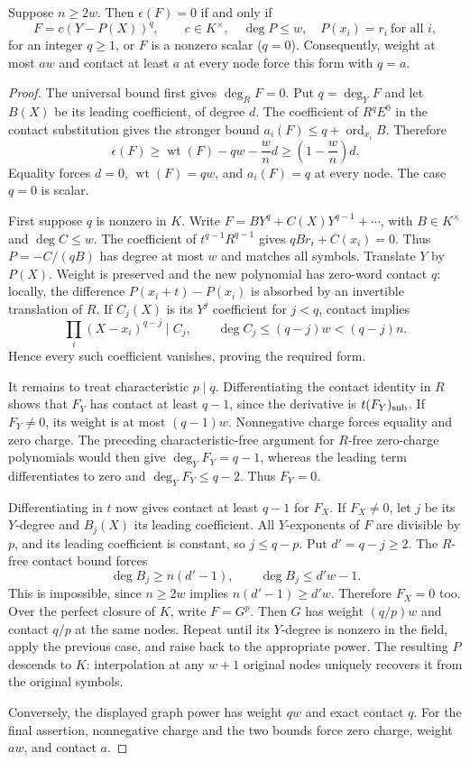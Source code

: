 \begin{theorem}
\label{cor:contact-zero-charge}
\label{thm:contact-uniform-rigidity}
Suppose $n\ge2w$. Then $\epsilon(F)=0$ if and only if
\[
 F=c(Y-P(X))^q,\qquad c\in K^\times,
 \quad\deg P\le w,\quad P(x_i)=r_i\ \text{for all }i,
\]
for an integer $q\ge1$, or $F$ is a nonzero scalar ($q=0$).
Consequently, weight at most $aw$ and contact at least $a$ at every
node force this form with $q=a$.
\end{theorem}
\begin{proof}
The universal bound first gives $\deg_R F=0$. Put $q=\deg_Y F$ and
let $B(X)$ be its leading coefficient, of degree $d$.
The coefficient of $R^qE^0$ in the contact substitution gives the
stronger bound $a_i(F)\le q+\operatorname{ord}_{x_i}B$. Therefore
\[
 \epsilon(F)\ge\operatorname{wt}(F)-qw-\frac wn d
 \ge\left(1-\frac wn\right)d.
\]
Equality forces $d=0$, $\operatorname{wt}(F)=qw$, and $a_i(F)=q$ at
every node. The case $q=0$ is scalar.

First suppose $q$ is nonzero in $K$. Write
$F=BY^q+C(X)Y^{q-1}+\cdots$, with $B\in K^\times$ and $\deg C\le w$.
The coefficient of $t^{q-1}R^{q-1}$ gives $qBr_i+C(x_i)=0$.
Thus $P=-C/(qB)$ has degree at most $w$ and matches all symbols.
Translate $Y$ by $P(X)$. Weight is preserved and the new polynomial
has zero-word contact $q$: locally, the difference
$P(x_i+t)-P(x_i)$ is absorbed by an invertible translation of $R$.
If $C_j(X)$ is its $Y^j$ coefficient for $j<q$, contact implies
\[
 \prod_i(X-x_i)^{q-j}\mid C_j,
 \qquad\deg C_j\le(q-j)w<(q-j)n.
\]
Hence every such coefficient vanishes, proving the required form.

It remains to treat characteristic $p\mid q$. Differentiating the
contact identity in $R$ shows that $F_Y$ has contact at least $q-1$,
since the derivative is $t(F_Y)_{\rm sub}$. If $F_Y\ne0$, its weight
is at most $(q-1)w$. Nonnegative charge forces equality and zero
charge. The preceding characteristic-free argument for $R$-free
zero-charge polynomials would then give
$\deg_Y F_Y=q-1$, whereas the leading term differentiates to zero
and $\deg_Y F_Y\le q-2$. Thus $F_Y=0$.

Differentiating in $t$ now gives contact at least $q-1$ for $F_X$.
If $F_X\ne0$, let $j$ be its $Y$-degree and $B_j(X)$ its leading
coefficient. All $Y$-exponents of $F$ are divisible by $p$, and its
leading coefficient is constant, so $j\le q-p$. Put $d'=q-j\ge2$.
The $R$-free contact bound forces
\[
 \deg B_j\ge n(d'-1),\qquad
 \deg B_j\le d'w-1.
\]
This is impossible, since $n\ge2w$ implies $n(d'-1)\ge d'w$.
Therefore $F_X=0$ too. Over the perfect closure of $K$, write $F=G^p$.
Then $G$ has weight $(q/p)w$ and contact $q/p$ at the same nodes.
Repeat until its $Y$-degree is nonzero in the field, apply the previous
case, and raise back to the appropriate power. The resulting $P$
descends to $K$: interpolation at any $w+1$ original nodes uniquely
recovers it from the original symbols.

Conversely, the displayed graph power has weight $qw$ and exact
contact $q$. For the final assertion, nonnegative charge and the two
bounds force zero charge, weight $aw$, and contact $a$.
\end{proof}

